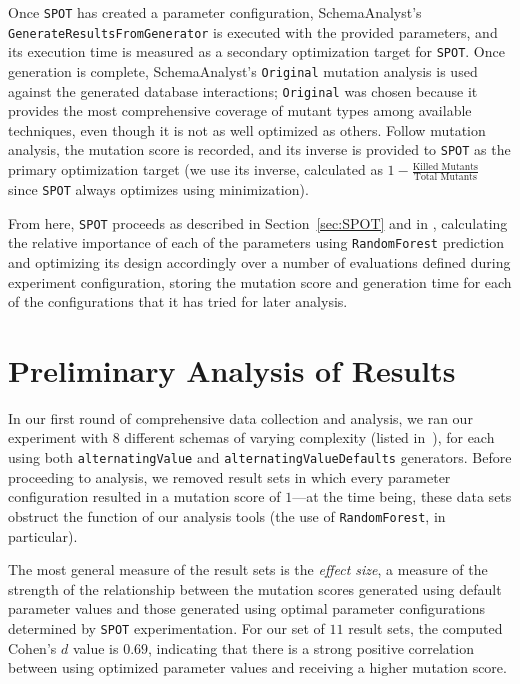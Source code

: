 \documentclass[a4paper,twocolumn]{article}
\begin{document}
Once \texttt{SPOT} has created a parameter configuration, SchemaAnalyst's \texttt{GenerateResultsFromGenerator} is executed with the provided parameters, and its execution time is measured as a secondary optimization target for \texttt{SPOT}. Once generation is complete, SchemaAnalyst's \texttt{Original} mutation analysis is used against the generated database interactions; \texttt{Original} was chosen because it provides the most comprehensive coverage of mutant types among available techniques, even though it is not as well optimized as others. Follow mutation analysis, the mutation score is recorded, and its inverse is provided to \texttt{SPOT} as the primary optimization target (we use its inverse, calculated as $1 - \frac{\text{Killed Mutants}}{\text{Total Mutants}}$ since \texttt{SPOT} always optimizes using minimization).

From here, \texttt{SPOT} proceeds as described in Section~\ref{sec:SPOT} and in \cite{SPOT2005}, calculating the relative importance of each of the parameters using \texttt{RandomForest} prediction and optimizing its design accordingly over a number of evaluations defined during experiment configuration, storing the mutation score and generation time for each of the configurations that it has tried for later analysis.

\section{Preliminary Analysis of Results}

In our first round of comprehensive data collection and analysis, we ran our experiment with $8$ different schemas of varying complexity (listed in~), for each using both \texttt{alternatingValue} and \texttt{alternatingValueDefaults} generators. Before proceeding to analysis, we removed result sets in which every parameter configuration resulted in a mutation score of $1$---at the time being, these data sets obstruct the function of our analysis tools (the use of \texttt{RandomForest}, in particular).

The most general measure of the result sets is the \textit{effect size}, a measure of the strength of the relationship between the mutation scores generated using default parameter values and those generated using optimal parameter configurations determined by \texttt{SPOT} experimentation. For our set of $11$ result sets, the computed Cohen's $d$ value is $0.69$, indicating that there is a strong positive correlation between using optimized parameter values and receiving a higher mutation score.
\end{document}
